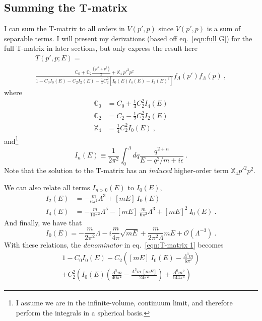 \documentclass[11pt]{article}
\begin{document}
 \subsection{Summing the T-matrix}
I can sum the T-matrix to all orders in $V(p',p)$ since $V(p',p)$ is a sum of separable terms.   I will present my derivations (based off eq.~\eqref{eqn:full G}) for the full T-matrix in later sections, but only express the result here
\begin{multline}\label{eqn:T-matrix 1}
T(p',p;E)=\\
\frac{\mathbb{C}_0+\mathbb{C}_2\frac{\left(p'^2+p^2\right)}{2}+\mathbb{X}_4\  p'^2p^2}
{1-C_0I_0(E)-C_2I_2(E)-\frac{1}{4}C^2_2\left[I_0(E)I_4(E)-I_2(E)^2\right]}f_\Lambda(p')f_\Lambda(p)\ ,
\end{multline}
where
\begin{align}
\mathbb{C}_0&=C_0+\frac{1}{4}C^2_2I_4(E)\\
\mathbb{C}_2&=C_2-\frac{1}{2}C^2_2I_2(E)\\
\mathbb{X}_4&=\frac{1}{4}C^2_2I_0(E)\ ,
\end{align}
and\footnote{I assume we are in the infinite-volume, continuum limit, and therefore perform the integrals in a spherical basis.}
\begin{equation}
I_n(E)\equiv \frac{1}{2\pi^2}\int_0^\Lambda dq\frac{q^{2+n}}{E-q^2/m+i\epsilon}\ .
\end{equation}
Note that the solution to the T-matrix has an \emph{induced} higher-order term $\mathbb{X}_4p'^2p^2$.  

We can also relate all terms $I_{n>0}(E)$ to $I_0(E)$,
\begin{align}
I_2(E)&=-\frac{m}{6\pi^2}\Lambda^3+[mE]\  I_0(E)\\
I_4(E)&=-\frac{m}{10\pi^2}\Lambda^5-[mE]\ \frac{m}{6\pi^2}\Lambda^3+[mE]^2\ I_0(E)\ .
\end{align}
And finally, we have that
\begin{equation}
I_0(E)=-\frac{m}{2\pi^2}\Lambda -i \frac{m}{4\pi}\sqrt{mE}+\frac{m}{2\pi^2\Lambda}mE+\mathcal{O}(\Lambda^{-3})\ .
\end{equation}
With these relations, the \emph{denominator} in eq.~\eqref{eqn:T-matrix 1} becomes
\begin{multline}\label{eqn:denominator}
1-C_0 I_0(E)-C_2 \left([mE]\ I_0(E) -\frac{\Lambda ^3 m}{6 \pi ^2}\right)\\
+C_2^2 \left(I_0(E) \left(\frac{\Lambda ^5 m}{40 \pi
   ^2}-\frac{\Lambda ^3 m\ [mE]}{24 \pi ^2}\right)+\frac{\Lambda ^6 m^2}{144 \pi
   ^4}\right)
   \end{multline}
\end{document}
